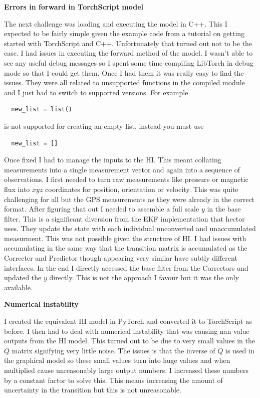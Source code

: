 \documentclass[]{../resources/final_report}
\begin{document}
\textbf{Errors in forward in TorchScript model}

The next challenge was loading and executing the model in C++. This I expected to be fairly simple given the example code from a tutorial on getting started with TorchScript and C++. Unfortunately that turned out not to be the case. I had issues in executing the forward method of the model. I wasn't able to see any useful debug messages so I spent some time compiling LibTorch in debug mode so that I could get them. Once I had them it was really easy to find the issues. They were all related to unsupported functions in the compiled module and I just had to switch to supported versions. For example
\begin{verbatim}
  new_list = list()
\end{verbatim} 
is not supported for creating an empty list, instead you must use
\begin{verbatim}
  new_list = []
\end{verbatim}

Once fixed I had to manage the inputs to the HI. This meant collating measurements into a single measurement vector and again into a sequence of observations. I first needed to turn raw measurements like pressure or magnetic flux into $xyz$ coordinates for position, orientation or velocity. This was quite challenging for all but the GPS measurements as they were already in the correct format. After figuring that out I needed to assemble a full scale $y$ in the base filter. This is a significant diversion from the EKF implementation that hector uses. They update the state with each individual unconverted and unaccumulated measurment. This was not possible given the structure of HI. I had issues with accumulating in the same way that the transition matrix is accumulated as the Correcter and Predictor though appearing very similar have subtly different interfaces. In the end I directly accessed the base filter from the Correctors and updated the $y$ directly. This is not the approach I favour but it was the only available.

\textbf{Numerical instability}

I created the equivalent HI model in PyTorch and converted it to TorchScript as before. I then had to deal with numerical instability that was causing nan value outputs from the HI model. This turned out to be due to very small values in the $Q$ matrix signifying very little noise. The issues is that the inverse of $Q$ is used in the graphical model so these small values turn into huge values and when multiplied cause unreasonably large output numbers. I increased these numbers by a constant factor to solve this. This means increasing the amount of uncertainty in the transition but this is not unreasonable.
\end{document}
